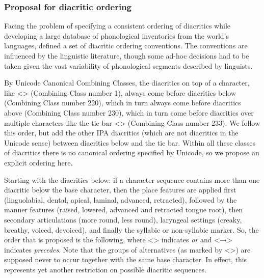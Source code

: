\subsubsection*{Proposal for diacritic ordering}

Facing the problem of specifying a consistent ordering of diacritics while
developing a large database of phonological inventories from the world's
languages, \citet[540]{Moran2012} defined a set of diacritic ordering
conventions. The conventions are influenced by the linguistic literature, though
some ad-hoc decisions had to be taken given the vast variability of phonological
segments described by linguists. 

By Unicode Canonical Combining Classes, the diacritics on top of a character,
like <> (Combining Class number 1), always come before diacritics
below (Combining Class number 220), which in turn always come before diacritics
above (Combining Class number 230), which in turn come before diacritics over
multiple characters like the tie bar <>
(Combining Class number 233). We follow this order, but add the other IPA
diacritics (which are not diacritics in the Unicode sense) between diacritics
below and the tie bar. Within all these classes of diacritics there is no canonical
ordering specified by Unicode, so we propose an explicit ordering here.

Starting with the diacritics below: if a character sequence contains more than
one diacritic below the base character, then the place features are applied
first (linguolabial, dental, apical, laminal, advanced, retracted), followed by
the manner features (raised, lowered, advanced and retracted tongue root), then
secondary articulations (more round, less round), laryngeal settings (creaky,
breathy, voiced, devoiced), and finally the syllabic or non-syllabic marker. So,
the order that is proposed is the following, where <\textbar{}> indicates
\textit{or} and <→> indicates \textit{precedes}. Note that the groups of
alternatives (as marked by <\textbar{}>) are supposed never to occur together
with the same base character. In effect, this represents yet another restriction
on possible diacritic sequences.

